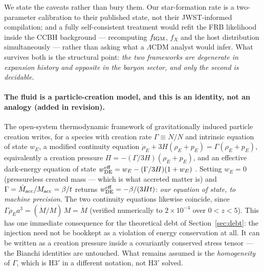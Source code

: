 \documentclass[11pt]{article}
\begin{document}
We state the caveats rather than bury them. Our star-formation rate is a two-parameter calibration
to their published state, not their JWST-informed compilation; and a fully self-consistent
treatment would refit the FRB likelihood inside the CCBH background --- recomputing
$f_{\rm IGM}$, $f_X$ and the host distribution simultaneously --- rather than asking what a
$\Lambda$CDM analyst would infer. What survives both is the structural point: \emph{the two
frameworks are degenerate in expansion history and opposite in the baryon sector, and only the
second is decidable}.

\paragraph{The fluid is a particle-creation model, and this is an identity, not an analogy
(added in revision).} The open-system thermodynamic framework of gravitationally induced
particle creation \cite{Prigogine1989,CLW1992} writes, for a species with creation rate
$\Gamma \equiv \dot N/N$ and intrinsic equation of state $w_E$, a modified continuity equation
$\dot\rho_E + 3H(\rho_E+p_E) = \Gamma(\rho_E+p_E)$, equivalently a creation pressure
$\Pi = -(\Gamma/3H)(\rho_E+p_E)$, and an effective dark-energy equation of state
$w_{\rm DE}^{\rm eff} = w_E - (\Gamma/3H)(1+w_E)$ \cite{Schiavone2026}. Setting $w_E = 0$
(pressureless created mass --- which is what accreted matter is) and
$\Gamma = \dot M_{\rm acc}/M_{\rm acc} = \beta/t$ returns $w_{\rm DE}^{\rm eff} = -\beta/(3Ht)$:
\emph{our equation of state, to machine precision}. The two continuity equations likewise
coincide, since $\Gamma \rho_E a^3 = (\dot M/M)\,M = \dot M$ (verified numerically to
$2\times10^{-4}$ over $0 < z < 5$). This has one immediate consequence for the theoretical
debt of Section~\ref{sec:debt}: the injection need not be bookkept as a violation of energy
conservation at all. It can be written as a creation pressure inside a covariantly conserved
stress tensor --- the Bianchi identities are untouched. What remains assumed is the
\emph{homogeneity} of $\Gamma$, which is H3$'$ in a different notation, not H3$'$ solved.
\end{document}
